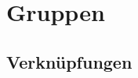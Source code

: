 \documentclass[parskip=full]{scrartcl}
\begin{document}
    \section{Gruppen}
        \subsection{Verknüpfungen}
\end{document}
